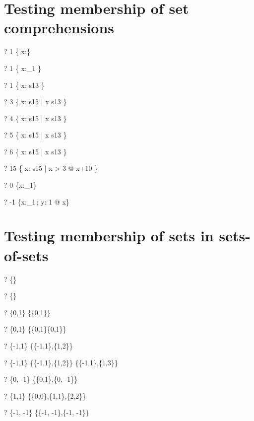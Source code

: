 \documentclass{article}
\newcommand{\negate}{-}
\begin{document}
\section{Testing membership of set comprehensions}
\begin{zed} \vdash?  1 \in    \{ x:\nat \} \end{zed}
\begin{zed} \vdash?  1 \in    \{ x:\nat_1 \} \end{zed}
\begin{zed} \vdash?  1 \in    \{ x: s13 \} \end{zed}
\begin{zed} \vdash?  3 \notin \{ x: s15 | x \notin s13 \} \end{zed}
\begin{zed} \vdash?  4 \in    \{ x: s15 | x \notin s13 \} \end{zed}
\begin{zed} \vdash?  5 \in    \{ x: s15 | x \notin s13 \} \end{zed}
\begin{zed} \vdash?  6 \notin \{ x: s15 | x \notin s13 \} \end{zed}
\begin{zed} \vdash?  15 \in   \{ x: s15 | x > 3 @ x+10 \} \end{zed}
\begin{zed} \vdash?  0 \notin \{x:\nat_1\} \end{zed}
\begin{zed} \vdash?  \negate 1 \notin \{x:\nat_1\,; y: 1  @ x\} \end{zed}


\section{Testing membership of sets in sets-of-sets}
\begin{zed} \vdash?  \emptyset \in \{\emptyset\} \end{zed}
\begin{zed} \vdash?  \emptyset \in \{\emptyset \cap \emptyset\} \end{zed}
\begin{zed} \vdash?  \{0,1\} \in \{\{0,1\}\} \end{zed}
\begin{zed} \vdash?  \{0,1\} \in \{\{0,1\}\cap\{0,1\}\} \end{zed}
\begin{zed} \vdash?  \{\negate 1,1\} \in \{\{\negate 1,1\},\{1,2\}\} \end{zed}
\begin{zed}
  \vdash?  \{\negate 1,1\} \in 
        \{\{\negate 1,1\},\{1,2\}\} \cap \{\{\negate 1,1\},\{1,3\}\}
\end{zed}
\begin{zed}
  \vdash?  \{0, \negate 1\} \in \{\{0,1\},\{0, \negate 1\}\}
\end{zed}
\begin{zed}
  \vdash?  \{1,1\} \in \{\{0,0\},\{1,1\},\{2,2\}\}
\end{zed}
\begin{zed}
  \vdash?  \{\negate 1, \negate 1\} 
       \in \{\{\negate 1, \negate 1\},\{\negate1, \negate 1\}\}
\end{zed}
\end{document}
